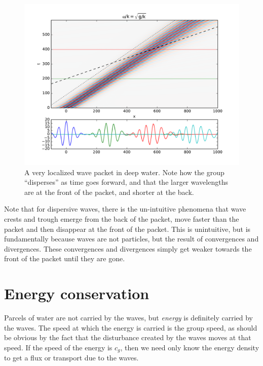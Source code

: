 \begin{figure}[hbt]
  \begin{center}
    \includegraphics{figs/Waves/DispersiveHov}
    \caption{A very localized wave packet in deep water.  Note how the group ``disperses'' as time goes forward, and that the larger wavelengths are at the front of the packet, and shorter at the back.  }
    \label{fig:DispersiveHov}  
  \end{center}
\end{figure}

Note that for dispersive waves, there is the un-intuitive phenomena that wave crests and trough emerge from the back of the packet, move faster than the packet and then disappear at the front of the packet. This is unintuitive, but is fundamentally because waves are not particles, but the result of convergences and divergences. These convergences and divergences simply get weaker towards the front of the packet until they are gone.  

\clearpage

\section{Energy conservation}

Parcels of water are not carried by the waves, but \emph{energy} is definitely carried by the waves.  The speed at which the energy is carried is the group speed, as should be obvious by the fact that the disturbance created by the waves moves at that speed.  If the speed of the energy is $c_g$, then we need only know the energy density to get a flux or transport due to the waves.  

